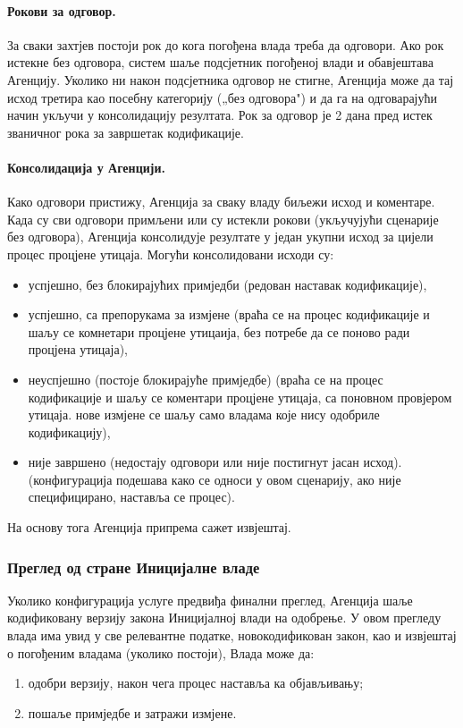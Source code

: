 \documentclass[12pt,a4paper]{article}
\begin{document}
\paragraph{Рокови за одговор.}

За сваки захтјев постоји рок до кога погођена влада треба да одговори. Ако рок истекне без одговора, систем шаље подсјетник погођеној влади и обавјештава Агенцију. Уколико ни након подсјетника одговор не стигне, Агенција може да тај исход третира као посебну категорију („без одговора") и да га на одговарајући начин укључи у консолидацију резултата. Рок за одговор је 2 дана пред истек званичног рока за завршетак кодификације.

\paragraph{Консолидација у Агенцији.}

Како одговори пристижу, Агенција за сваку владу биљежи исход и коментаре. Када су сви одговори примљени или су истекли рокови (укључујући сценарије без одговора), Агенција консолидује резултате у један укупни исход за цијели процес процјене утицаја. Могући консолидовани исходи су:
\begin{itemize}
    \item успјешно, без блокирајућих примједби (редован наставак кодификације),
    \item успјешно, са препорукама за измјене (враћа се на процес кодификације и шаљу се комнетари процјене утицаија, без потребе да се поново ради процјена утицаја),
    \item неуспјешно (постоје блокирајуће примједбе) (враћа се на процес кодификације и шаљу се коментари процјене утицаја, са поновном провјером утицаја. нове измјене се шаљу само владама које нису одобриле кодификацију),
    \item није завршено (недостају одговори или није постигнут јасан исход). (конфигурација подешава како се односи у овом сценарију, ако није специфицирано, наставља се процес).
\end{itemize}
На основу тога Агенција припрема сажет извјештај.

\subsubsection{Преглед од стране Иницијалне владе}

Уколико конфигурација услуге предвиђа финални преглед, Агенција шаље кодификовану верзију закона Иницијалној влади на одобрење. У овом прегледу влада има увид у све релевантне податке, новокодификован закон, као и извјештај о погођеним владама (уколико постоји), Влада може да:
\begin{enumerate}[label=\alph*)]
    \item одобри верзију, након чега процес наставља ка објављивању;
    \item пошаље примједбе и затражи измјене.
\end{enumerate}
\end{document}
